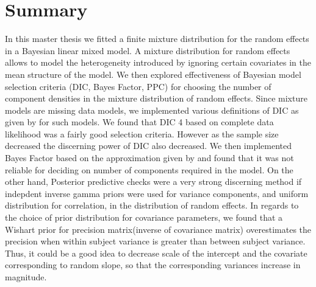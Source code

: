 
\chapter{Summary}
\label{ch : summary}

In this master thesis we fitted a finite mixture distribution for the random effects in a Bayesian linear mixed model. A mixture distribution for random effects allows to model the heterogeneity introduced by ignoring certain covariates in the mean structure of the model. We then explored effectiveness of Bayesian model selection criteria (DIC, Bayes Factor, PPC) for choosing the number of component densities in the mixture distribution of random effects. Since mixture models are missing data models, we implemented various definitions of DIC as given by \citet{celeux_deviance_2006} for such models. We found that DIC 4 based on complete data likelihood was a fairly good selection criteria. However as the sample size decreased the discerning power of DIC also decreased. We then implemented Bayes Factor based on the approximation given by \citet{chib_marginal_1995} and found that it was not reliable for deciding on number of components required in the model. On the other hand, Posterior predictive checks were a very strong discerning method if indepdent inverse gamma priors were used for variance components, and uniform distribution for correlation, in the distribution of random effects. In regards to the choice of prior distribution for covariance parameters, we found that a Wishart prior for precision matrix(inverse of covariance matrix) overestimates the precision when within subject variance is greater than between subject variance. Thus, it could be a good idea to decrease scale of the intercept and the covariate corresponding to random slope, so that the corresponding variances increase in magnitude.